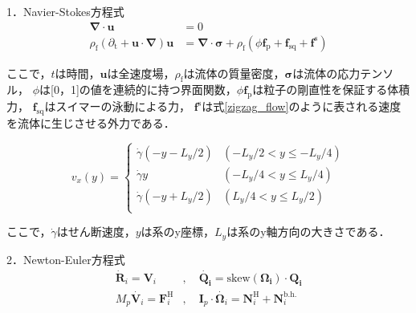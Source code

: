\documentclass[twocolumns,10pt,a4j]{jarticle}
\begin{document}
\par
1．Navier-Stokes方程式\\
  \vspace{-3truemm}
  \small
  \begin{equation}
    \begin{split}
      \boldsymbol{\nabla}\cdot\boldsymbol{u} &= 0 \\
      \rho_\mathrm{f} \left(\partial_\mathrm{t} + \boldsymbol{u} \cdot \boldsymbol{\nabla} \right) \boldsymbol{u} &= \boldsymbol{\nabla} \cdot \boldsymbol{\sigma} + \rho_\mathrm{f} \left( \phi \boldsymbol{f}_\mathrm{p} + \boldsymbol{f}_\mathrm{sq} + \boldsymbol{f}^\mathrm{s} \right)
    \end{split}
    \label{Navier_Stokes}
  \end{equation}
  \normalsize
  \vspace{-4truemm}

  \noindent
ここで，$t$は時間，$\boldsymbol{u}$は全速度場，$\rho_\mathrm{f}$は流体の質量密度，$\boldsymbol{\sigma}$は流体の応力テンソル，
$\phi$は[0，1]の値を連続的に持つ界面関数，$\phi \boldsymbol{f}_\mathrm{p}$は粒子の剛直性を保証する体積力，
$\boldsymbol{f}_\mathrm{sq}$はスイマーの泳動による力，
$\boldsymbol{f}^\mathrm{s}$は式\eqref{zigzag_flow}のように表される速度を流体に生じさせる外力である．
  \par
  \vspace{-6truemm}
  \small
  \begin{equation}
    v_x(y) =
    \begin{cases}
      \dot{\gamma} (-y - L_y/2) & (-L_y/2 < y \le -L_y/4) \\
      \dot{\gamma} y            & (-L_y/4 < y \le L_y/4) \\
      \dot{\gamma} (-y + L_y/2) & (L_y/4 < y \le L_y/2)\\
    \end{cases}
    \label{zigzag_flow}
  \end{equation}
  \normalsize
  \vspace{-4truemm}

  \noindent
 ここで，$\dot{\gamma}$はせん断速度，$y$は系のy座標，$L_y$は系のy軸方向の大きさである．

  \par
2．Newton-Euler方程式\\
  \vspace{-6truemm}
  \begin{equation}
    \begin{split}
      \dot{\boldsymbol{R}}_i = \boldsymbol{V}_i &, \quad \boldsymbol{\dot{Q_i}} = \mathrm{skew} (\boldsymbol{\Omega_i}) \cdot \boldsymbol{Q_i} \\
      M_p \dot{\boldsymbol{V}_i} = \boldsymbol{F}_i^\mathrm{H} &, \quad
      \boldsymbol{I}_p \cdot \dot{\boldsymbol{\Omega}_i} = \boldsymbol{N}_i^\mathrm{H} + \boldsymbol{N}_i^\mathrm{b.h.}
    \end{split}
    \label{Newton_Euler}
  \end{equation}
  \vspace{-4truemm}
\end{document}
